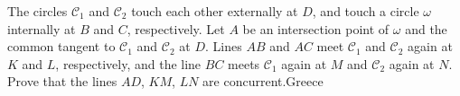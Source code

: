 The circles $\mathcal C_1$ and $\mathcal C_2$ touch each other externally at $D$,  and touch a circle $\omega$ internally at $B$ and $C$,  respectively. Let $A$ be an intersection point of $\omega$ and the common tangent to $\mathcal C_1$ and $\mathcal C_2$ at $D$. Lines $AB$ and $AC$ meet $\mathcal C_1$ and $\mathcal C_2$ again at $K$ and $L$,  respectively, and the line $BC$ meets $\mathcal C_1$ again at $M$ and $\mathcal C_2$ again at $N$. Prove that the lines $AD$,  $KM$,  $LN$ are concurrent.Greece